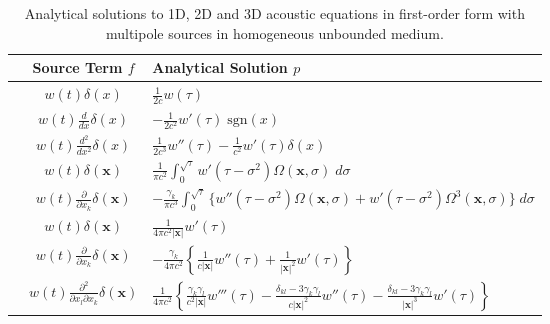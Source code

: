 \begin{table}[!h]
\renewcommand{\arraystretch}{2}
	\centering
	\small
	\begin{tabular}{c | c | l }
	& \multicolumn{1}{c|}{Source Term $f$} & \multicolumn{1}{l}{Analytical Solution $p$}\\ \hline\hline
	\parbox[t]{2mm}{} 
		&$w(t)\delta(x)$ 				& $ \displaystyle \frac{1}{2c} w(\tau)$ \\
		&$w(t)\frac{d}{dx}\delta(x)$ 		& $ \displaystyle -\frac{1}{2c^2} w'(\tau) \; \text{sgn}(x)$ \\
		&$w(t)\frac{d^2}{dx^2}\delta(x)$	& $ \displaystyle \frac{1}{2c^3} w''(\tau) - \frac{1}{c^2} w'(\tau) \delta(x)$\\ 
	\hline\hline
	\parbox[t]{2mm}{} 
		&$w(t)\delta(\mathbf x)$ & $ \displaystyle \frac{1}{\pi c^2} \int_0^{\sqrt{\tau}} w'(\tau-\sigma^2)\Omega(\mathbf x, \sigma) \; d\sigma$\\
		&$w(t) \frac{\partial}{\partial x_k} \delta(\mathbf x)$ 
		& $\displaystyle-\frac{\gamma_k}{\pi c^3}  \int_{0}^{\sqrt{\tau}} 
		\Big\{ w''(\tau-\sigma^2) \Omega(\mathbf x,\sigma)
			+ w'(\tau-\sigma^2)\Omega^3(\mathbf x,\sigma) \Big\}\; d\sigma $ \\
		\hline\hline
	\parbox[t]{2mm}{} 
		&$w(t) \delta(\mathbf x)$ & $\displaystyle \frac{1}{4\pi c^2 |\mathbf x|} w'(\tau)$ \\
		&$w(t) \frac{\partial}{\partial x_k}\delta(\mathbf x)$ 
			& $ 	\displaystyle -\frac{\gamma_k}{4\pi c^2} \left\{ 
					\frac{1}{c|\mathbf x|} w''(\tau) +
					\frac{1}{|\mathbf x|^2} w'(\tau) 
				\right\} $ \\
		&$w(t)\frac{\partial^2}{\partial x_l\partial x_k}\delta(\mathbf x)$ 
			& $ 	\displaystyle \frac{1}{4\pi c^2} \left\{ 
					 \frac{\gamma_k\gamma_l}{c^2|\mathbf x|} w'''(\tau) -
					\frac{\delta_{kl}-3\gamma_k\gamma_l}{c|\mathbf x|^2} w''(\tau) -
					\frac{\delta_{kl}-3\gamma_k\gamma_l}{|\mathbf x|^3} w'(\tau)					 
				\right\} $
	\end{tabular}
    \caption{Analytical solutions to 1D, 2D and 3D acoustic equations in first-order form with multipole sources in homogeneous unbounded medium.}
    \label{tab:AnSol}
\end{table}


